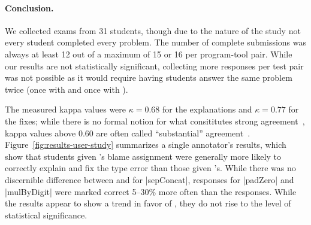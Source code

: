 \paragraph{Conclusion.}
%
We collected exams from 31 students, though due to the nature of the
study not every student completed every problem.
%
The number of complete submissions was always at least 12 out of
a maximum of 15 or 16 per program-tool pair.
%
While our results are not statistically significant,
collecting more responses per test pair was not possible as it
would require having students answer the same problem twice (once with
\sherrloc and once with \toolname).




%
The measured kappa values were $\kappa = 0.68$ for the explanations and
$\kappa = 0.77$ for the fixes; while there is no formal notion for what
consititutes strong agreement~\cite{Krippendorff2012-wd}, kappa values
above $0.60$ are often called ``substantial''
agreement~\cite{Landis1977-ey}.
%
Figure~\ref{fig:results-user-study} summarizes a single annotator's
results, which show that students given \toolname's blame assignment
were generally more likely to correctly explain and fix the type error
than those given \sherrloc's.
%
While there was no discernible difference between \toolname and
\sherrloc for |sepConcat|, \toolname responses for |padZero| and
|mulByDigit| were marked correct 5--30\% more often than the \sherrloc
responses.
%
While the results appear to show a trend in favor of \toolname,
they do not rise to the level of statistical significance.
%
